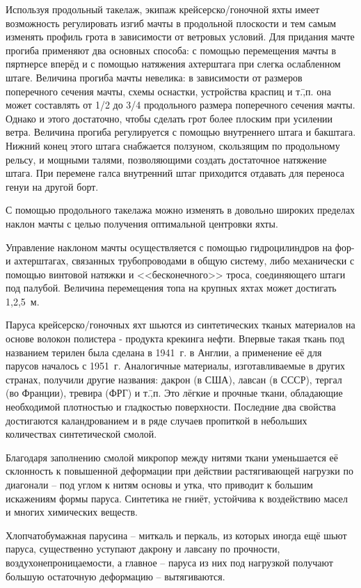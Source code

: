Используя продольный такелаж, экипаж крейсерско\-/гоночной яхты имеет
возможность регулировать изгиб мачты в продольной плоскости и тем
самым изменять профиль грота в зависимости от ветровых условий. Для
придания мачте прогиба применяют два основных способа: с помощью
перемещения мачты в пяртнерсе вперёд и с помощью натяжения ахтерштага
при слегка ослабленном штаге. Величина прогиба мачты невелика: в
зависимости от размеров поперечного сечения мачты, схемы оснастки,
устройства краспиц и т.\=,п. она может составлять от 1/2 до 3/4
продольного размера поперечного сечения мачты. Однако и этого
достаточно, чтобы сделать грот более плоским при усилении
ветра. Величина прогиба регулируется с помощью внутреннего штага и
бакштага. Нижний конец этого штага снабжается ползуном, скользящим по
продольному рельсу, и мощными талями, позволяющими создать достаточное
натяжение штага. При перемене галса внутренний штаг приходится
отдавать для переноса генуи на другой борт.

С помощью продольного такелажа можно изменять в довольно широких
пределах наклон мачты с целью получения оптимальной центровки яхты.

Управление наклоном мачты осуществляется с помощью гидроцилиндров на
фор- и ахтерштагах, связанных трубопроводами в общую систему, либо
механически с помощью винтовой натяжки и <<бесконечного>> троса,
соединяющего штаги под палубой. Величина перемещения топа на крупных
яхтах может достигать 1,2,5~м.

Паруса крейсерско\-/гоночных яхт шьются из синтетических тканых
материалов на основе волокон полистера \-- продукта крекинга
нефти. Впервые такая ткань под названием терилен была сделана в
1941~г. в Англии, а применение её для парусов началось с
1951~г. Аналогичные материалы, изготавливаемые в других странах,
получили другие названия: дакрон (в США), лавсан (в СССР), тергал (во
Франции), тревира (ФРГ) и т.\=,п. Это лёгкие и прочные ткани,
обладающие необходимой плотностью и гладкостью поверхности. Последние
два свойства достигаются каландрованием и в ряде случаев пропиткой в
небольших количествах синтетической смолой.

Благодаря заполнению смолой микропор между нитями ткани уменьшается её
склонность к повышенной деформации при действии растягивающей нагрузки
по диагонали \--- под углом к нитям основы и утка, что приводит к
большим искажениям формы паруса. Синтетика не гниёт, устойчива к
воздействию масел и многих химических веществ.

Хлопчатобумажная парусина \--- миткаль и перкаль, из которых иногда
ещё шьют паруса, существенно уступают дакрону и лавсану по прочности,
воздухонепроницаемости, а главное \--- паруса из них под нагрузкой
получают большую остаточную деформацию \--- вытягиваются.

